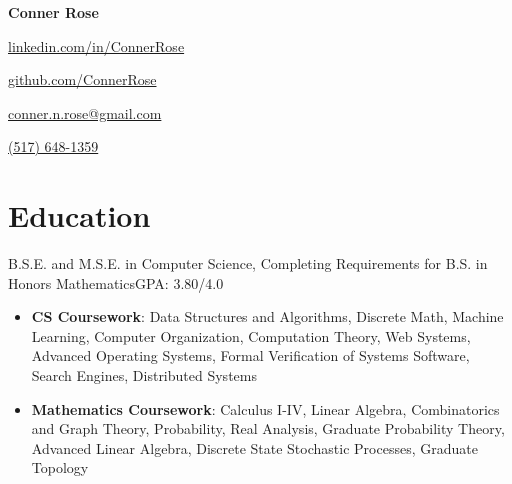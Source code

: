 \documentclass[letterpaper,11pt]{article}
\begin{document}
\begin{center}
  \huge{\textbf{Conner Rose}} \\
  \begin{itemize*}
    \item[] \href{https://linkedin.com/in/ConnerRose}{linkedin.com/in/ConnerRose}
    \item \href{https://github.com/ConnerRose}{github.com/ConnerRose}
    \item \href{mailto:conner.n.rose@gmail.com}{conner.n.rose@gmail.com}
    \item \href{tel:+15176481359}{(517) 648-1359}
  \end{itemize*}
\end{center}

\section{Education}
{B.S.E. and M.S.E. in Computer Science, Completing Requirements for B.S. in
  Honors Mathematics}{GPA: 3.80/4.0}
\begin{itemize}
  \item \textbf{CS Coursework}: Data Structures and Algorithms, Discrete Math,
        Machine Learning, Computer Organization, Computation Theory,
        Web Systems, Advanced Operating Systems, Formal Verification of Systems
        Software, Search Engines, Distributed Systems
  \item \textbf{Mathematics Coursework}: Calculus I-IV, Linear Algebra,
        Combinatorics and Graph Theory, Probability, Real Analysis, Graduate
        Probability Theory, Advanced Linear Algebra, Discrete State Stochastic
        Processes, Graduate Topology
\end{itemize}
\end{document}
